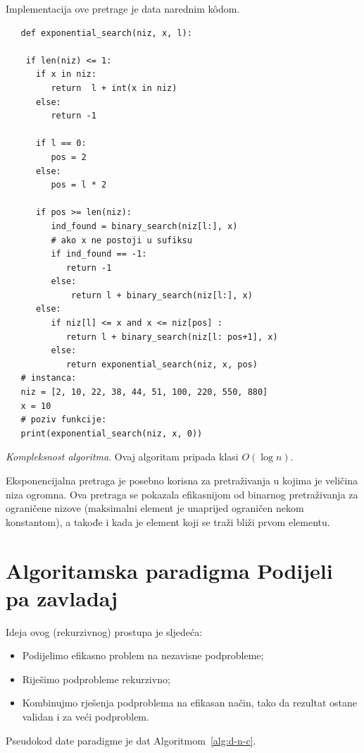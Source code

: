    Implementacija ove pretrage je data narednim k\^odom. 
   
   \begin{verbatim}
   def exponential_search(niz, x, l):
   
   	if len(niz) <= 1:
   	  if x in niz:
   		 return  l + int(x in niz)
   	  else:
  		 return -1 
   
   	  if l == 0:
   		 pos = 2
   	  else:
   		 pos = l * 2
   
   	  if pos >= len(niz):
   		 ind_found = binary_search(niz[l:], x)
		 # ako x ne postoji u sufiksu
   		 if ind_found == -1:  
   			return -1
   		 else:
   			 return l + binary_search(niz[l:], x)
   	  else:
   		 if niz[l] <= x and x <= niz[pos] :
   		    return l + binary_search(niz[l: pos+1], x)
   		 else:
   		    return exponential_search(niz, x, pos)
   # instanca:
   niz = [2, 10, 22, 38, 44, 51, 100, 220, 550, 880]
   x = 10
   # poziv funkcije: 
   print(exponential_search(niz, x, 0))
   \end{verbatim}

\textit{Kompleksnost algoritma}.  Ovaj algoritam pripada klasi $O(\log n)$. 
 

Eksponencijalna pretraga je posebno korisna za pretraživanja u kojima je  veličina niza ogromna.  Ova pretraga se pokazala efikasnijom   od binarnog pretraživanja za ograničene nizove (maksimalni element je unaprijed ograničen nekom konstantom), a takođe i kada je element koji se traži bliži prvom elementu.

\section{Algoritamska paradigma Podijeli pa zavladaj}
Ideja ovog (rekurzivnog) prostupa je sljedeća:
\begin{itemize}
	\item  Podijelimo efikasno problem   na nezavisne podprobleme;
	\item Riješimo podprobleme rekurzivno;
	\item  Kombinujmo rješenja podproblema na efikasan način, tako da rezultat ostane validan i za veći podproblem.
\end{itemize}

Pseudokod date paradigme je dat  Algoritmom~\ref{alg:d-n-c}. 

  

